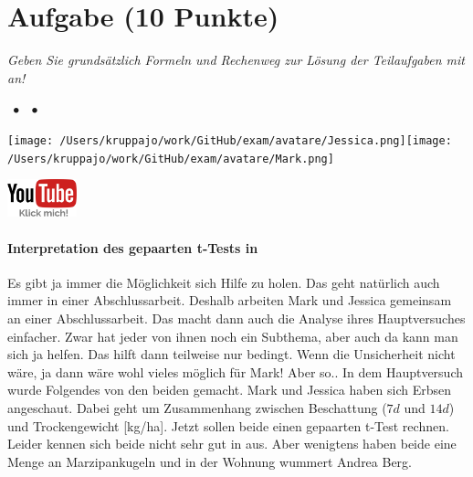 \documentclass[a4paper, 9pt]{scrartcl}\usepackage[]{graphicx}\usepackage[]{xcolor}
\begin{document}
\section{Aufgabe \hfill (10 Punkte)}

\textit{Geben Sie grundsätzlich Formeln und Rechenweg zur Lösung der Teilaufgaben mit an!} \\[1Ex]
 

 
\ifcollection
\begin{flushright}
\tiny\vspace{-3Ex}
\textbf{\examinhaltstart}
\exammodulestat $\;\bullet$
\exammodulestatversuch $\;\bullet$
\exammodulebiostat
\vspace{-4Ex}
\end{flushright}
\begin{minipage}[t]{0.5\textwidth}
\texttt{[image: /Users/kruppajo/work/GitHub/exam/avatare/Jessica.png]}\hspace{-4mm}\texttt{[image: /Users/kruppajo/work/GitHub/exam/avatare/Mark.png]}
\end{minipage}
\begin{minipage}[t]{0.5\textwidth}
\hfill
\href{https://youtu.be/kHmfEmU6lrk}{\includegraphics[width = 2cm]{img/youtube}}
\end{minipage}
\fi



\ifcollection
\paragraph{Interpretation des gepaarten t-Tests in \Rlogo}
\fi

Es gibt ja immer die Möglichkeit sich Hilfe zu holen. Das geht natürlich auch immer in einer Abschlussarbeit. Deshalb arbeiten Mark und Jessica gemeinsam an einer Abschlussarbeit. Das macht dann auch die Analyse ihres Hauptversuches einfacher. Zwar hat jeder von ihnen noch ein Subthema, aber auch da kann man sich ja helfen. Das hilft dann teilweise nur bedingt. Wenn die Unsicherheit nicht wäre, ja dann wäre wohl vieles möglich für Mark! Aber so.. In dem Hauptversuch wurde Folgendes von den beiden gemacht. Mark und Jessica haben sich Erbsen angeschaut. Dabei geht um Zusammenhang zwischen Beschattung ($7d$ und $14d$) und Trockengewicht [kg/ha]. Jetzt sollen beide einen gepaarten t-Test rechnen. Leider kennen sich beide nicht sehr gut in \Rlogo aus. Aber wenigtens haben beide eine Menge an Marzipankugeln und in der Wohnung wummert Andrea Berg.
\end{document}
